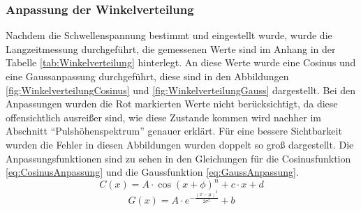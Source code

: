 \documentclass{article}
\begin{document}
\subsubsection*{Anpassung der Winkelverteilung}
Nachdem die Schwellenspannung bestimmt und eingestellt wurde, wurde die Langzeitmessung durchgeführt, die gemessenen Werte sind im Anhang in der Tabelle \ref{tab:Winkelverteilung} hinterlegt.
An diese Werte wurde eine Cosinus und eine Gaussanpassung durchgeführt, diese sind in den Abbildungen \ref{fig:WinkelverteilungCosinus} und \ref{fig:WinkelverteilungGauss} dargestellt.
Bei den Anpassungen wurden die Rot markierten Werte nicht berücksichtigt, da diese offensichtlich ausreißer sind, wie diese Zustande kommen wird nachher im Abschnitt \enquote{Pulshöhenspektrum} genauer erklärt.
Für eine bessere Sichtbarkeit wurden die Fehler in diesen Abbildungen wurden doppelt so groß dargestellt.
Die Anpassungsfunktionen sind zu sehen in den Gleichungen für die Cosinusfunktion \ref{eq:CosinusAnpassung} und die Gaussfunktion \ref{eq:GaussAnpassung}.
\begin{equation}
   C(x) = A \cdot \cos( x + \phi )^n + c \cdot x + d
\label{eq:CosinusAnpassung}
\end{equation}
\begin{equation}
    G(x) = A \cdot e^{-\frac{(x - \mu)^2}{2\sigma^2}} + b
\label{eq:GaussAnpassung}
\end{equation}
\end{document}
